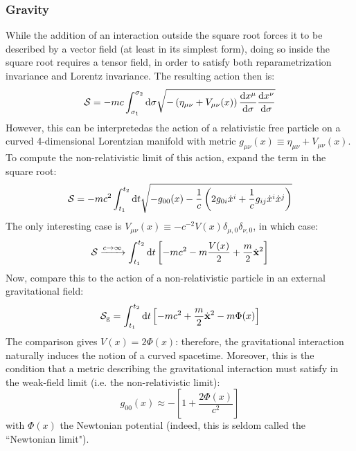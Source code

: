 \subsubsection{Gravity}
\label{sssec:gravity}

While the addition of an interaction outside the square root forces it to be described by a vector field (at least in its simplest form), doing so inside the square root requires a tensor field, in order to satisfy both reparametrization invariance and Lorentz invariance. The resulting action then is:
\begin{equation*}
  \mathcal{S} = - m c \int_{\sigma_1}^{\sigma_2} \mathrm{d} \sigma \sqrt{- \left( \eta_{\mu \nu} + V_{\mu \nu}(x) \right) \frac{\mathrm{d} x^\mu}{\mathrm{d} \sigma} \frac{\mathrm{d} x^\nu}{\mathrm{d} \sigma}}
\end{equation*}
However, this can be interpreted\footnotemark as the action of a relativistic free particle on a curved 4-dimensional Lorentzian manifold with metric $ g_{\mu \nu}(x) \equiv \eta_{\mu \nu} + V_{\mu \nu}(x) $. To compute the non-relativistic limit of this action, expand the term in the square root:
\begin{equation*}
  \mathcal{S} = - m c^2 \int_{t_1}^{t_2} \mathrm{d} t \sqrt{- g_{00}(x) - \frac{1}{c} \left( 2 g_{0i} \dot{x}^i + \frac{1}{c} g_{ij} \dot{x}^i \dot{x}^j \right)}
\end{equation*}
The only interesting case is $ V_{\mu \nu}(x) \equiv - c^{-2} V(x) \delta_{\mu , 0} \delta_{\nu , 0} $, in which case:
\begin{equation*}
  \mathcal{S} \xrightarrow{c \rightarrow \infty} \int_{t_1}^{t_2} \mathrm{d} t \left[ - m c^2 - m \frac{V(x)}{2} + \frac{m}{2} \dot{\mathbf{x}}^2 \right]
\end{equation*}
Now, compare this to the action of a non-relativistic particle in an external gravitational field:
\begin{equation*}
  \mathcal{S}_\text{g} = \int_{t_1}^{t_2} \mathrm{d} t \left[ - m c^2 + \frac{m}{2} \dot{\mathbf{x}}^2 - m \Phi(x) \right]
\end{equation*}
The comparison gives $ V(x) = 2 \Phi(x) $: therefore, the gravitational interaction naturally induces the notion of a curved spacetime. Moreover, this is the condition that a metric describing the gravitational interaction must satisfy in the weak-field limit (i.e. the non-relativistic limit):
\begin{equation}
  g_{00}(x) \approx - \left[ 1 + \frac{2 \Phi(x)}{c^2} \right]
  \label{eq:newtonian-limit}
\end{equation}
with $ \Phi(x) $ the Newtonian potential (indeed, this is seldom called the ``Newtonian limit").

